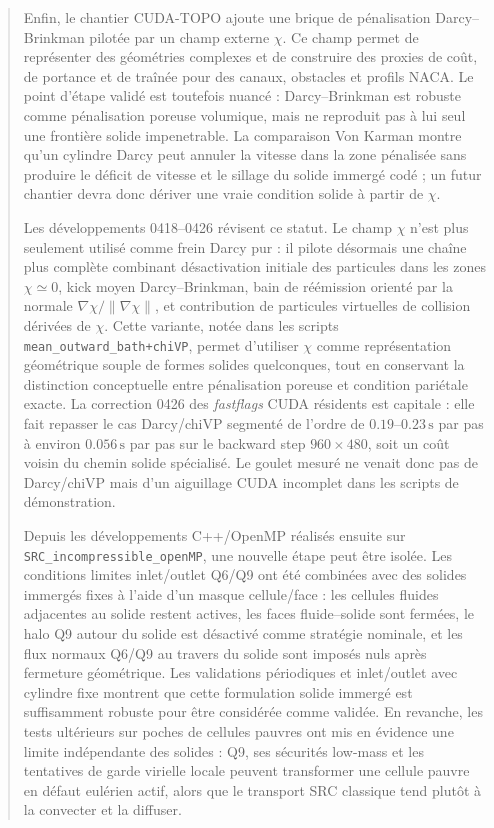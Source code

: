 \documentclass[11pt,a4paper]{article}
\begin{document}
\begin{abstract}
Enfin, le chantier CUDA-TOPO ajoute une brique de pénalisation Darcy--Brinkman pilotée par un champ externe $\chi$. Ce champ permet de représenter des géométries complexes et de construire des proxies de coût, de portance et de traînée pour des canaux, obstacles et profils NACA. Le point d'étape validé est toutefois nuancé : Darcy--Brinkman est robuste comme pénalisation poreuse volumique, mais ne reproduit pas à lui seul une frontière solide impenetrable. La comparaison Von Karman montre qu'un cylindre Darcy peut annuler la vitesse dans la zone pénalisée sans produire le déficit de vitesse et le sillage du solide immergé codé ; un futur chantier devra donc dériver une vraie condition solide à partir de $\chi$.

Les développements 0418--0426 révisent ce statut. Le champ $\chi$ n'est plus seulement utilisé comme frein Darcy pur : il pilote désormais une chaîne plus complète combinant désactivation initiale des particules dans les zones $\chi\simeq0$, kick moyen Darcy--Brinkman, bain de réémission orienté par la normale $\nabla\chi/\|\nabla\chi\|$, et contribution de particules virtuelles de collision dérivées de $\chi$. Cette variante, notée dans les scripts \texttt{mean\_outward\_bath+chiVP}, permet d'utiliser $\chi$ comme représentation géométrique souple de formes solides quelconques, tout en conservant la distinction conceptuelle entre pénalisation poreuse et condition pariétale exacte. La correction 0426 des \emph{fastflags} CUDA résidents est capitale : elle fait repasser le cas Darcy/chiVP segmenté de l'ordre de $0.19$--$0.23\,\si{\second}$ par pas à environ $0.056\,\si{\second}$ par pas sur le backward step $960\times480$, soit un coût voisin du chemin solide spécialisé. Le goulet mesuré ne venait donc pas de Darcy/chiVP mais d'un aiguillage CUDA incomplet dans les scripts de démonstration.


Depuis les développements C++/OpenMP réalisés ensuite sur \texttt{SRC\_incompressible\_openMP}, une nouvelle étape peut être isolée. Les conditions limites inlet/outlet Q6/Q9 ont été combinées avec des solides immergés fixes à l'aide d'un masque cellule/face : les cellules fluides adjacentes au solide restent actives, les faces fluide--solide sont fermées, le halo Q9 autour du solide est désactivé comme stratégie nominale, et les flux normaux Q6/Q9 au travers du solide sont imposés nuls après fermeture géométrique. Les validations périodiques et inlet/outlet avec cylindre fixe montrent que cette formulation solide immergé est suffisamment robuste pour être considérée comme validée. En revanche, les tests ultérieurs sur poches de cellules pauvres ont mis en évidence une limite indépendante des solides : Q9, ses sécurités low-mass et les tentatives de garde virielle locale peuvent transformer une cellule pauvre en défaut eulérien actif, alors que le transport SRC classique tend plutôt à la convecter et la diffuser.


\end{abstract}
\end{document}
